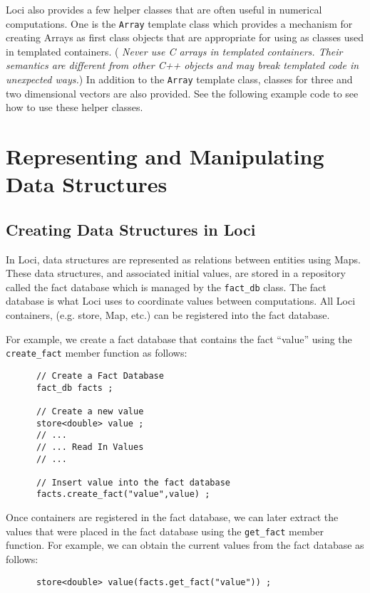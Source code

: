 \documentclass[10pt,epsf]{book}
\begin{document}
Loci also provides a few helper classes that are often useful in
numerical computations.  One is the {\tt Array} template class which provides a
mechanism for creating Arrays as first class objects that are
appropriate for using as classes used in templated containers. ({\it
Never use C arrays in templated containers.  Their semantics are
different from other C++ objects and may break templated code in
unexpected ways.})  In addition to the {\tt Array} template class,
classes for three and two dimensional vectors are also provided.  See
the following example code to see how to use these helper classes.



\chapter{Representing and Manipulating Data Structures}
\section{Creating Data Structures in Loci}

In Loci, data structures are represented as relations between entities
using Maps.  These data structures, and associated initial values, are
stored in a repository called the fact database which is managed by
the {\tt fact\_db} class.  The fact database is what Loci uses to
coordinate values between computations.  All Loci containers, (e.g.
store, Map, etc.) can be registered into the fact database.

For example, we create a fact database that contains the fact ``value'' using the {\tt create\_fact} member function as follows:
\begin{verbatim}
      // Create a Fact Database
      fact_db facts ;

      // Create a new value
      store<double> value ;
      // ...
      // ... Read In Values
      // ...
   
      // Insert value into the fact database
      facts.create_fact("value",value) ;
\end{verbatim}

Once containers are registered in the fact database, we can later
extract the values that were placed in the fact database using the 
{\tt get\_fact} member function.  For example, we can obtain the
current values from the fact database as follows:
\begin{verbatim}
      store<double> value(facts.get_fact("value")) ;
\end{verbatim}
\end{document}
